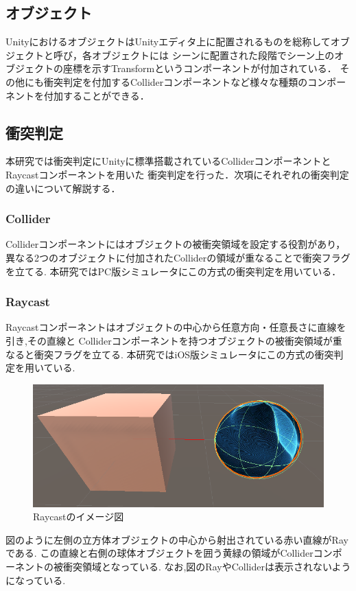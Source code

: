 \documentclass{ltjsreport}
\begin{document}
		\subsection{オブジェクト}
			UnityにおけるオブジェクトはUnityエディタ上に配置されるものを総称してオブジェクトと呼び，各オブジェクトには
			シーンに配置された段階でシーン上のオブジェクトの座標を示すTransformというコンポーネントが付加されている．
			その他にも衝突判定を付加するColliderコンポーネントなど様々な種類のコンポーネントを付加することができる．
		\subsection{衝突判定}
			本研究では衝突判定にUnityに標準搭載されているColliderコンポーネントとRaycastコンポーネントを用いた
			衝突判定を行った．次項にそれぞれの衝突判定の違いについて解説する．
			\subsubsection{Collider}
				Colliderコンポーネントにはオブジェクトの被衝突領域を設定する役割があり，
				異なる2つのオブジェクトに付加されたColliderの領域が重なることで衝突フラグを立てる.
				本研究ではPC版シミュレータにこの方式の衝突判定を用いている．

\clearpage
		\subsubsection{Raycast}
			Raycastコンポーネントはオブジェクトの中心から任意方向・任意長さに直線を引き,その直線と
			Colliderコンポーネントを持つオブジェクトの被衝突領域が重なると衝突フラグを立てる.
			本研究ではiOS版シミュレータにこの方式の衝突判定を用いている.
			\begin{figure}[H]
			\centering
			\includegraphics[width = 12cm]{../figs/raycast.png}
			\caption{Raycastのイメージ図}
			\label{fig:Raycast}
			\end{figure}

			図のように左側の立方体オブジェクトの中心から射出されている赤い直線がRayである.
			この直線と右側の球体オブジェクトを囲う黄緑の領域がColliderコンポーネントの被衝突領域となっている.
			なお,図のRayやColliderは表示されないようになっている.
\end{document}
